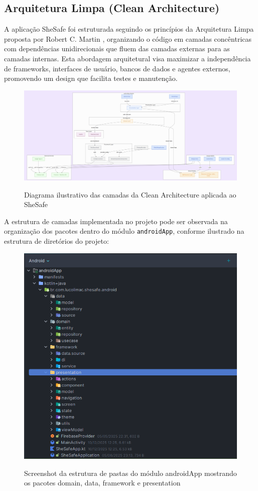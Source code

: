 \subsection{Arquitetura Limpa (Clean Architecture)}
A aplicação SheSafe foi estruturada seguindo os princípios da Arquitetura Limpa proposta por Robert C. Martin \cite{martin2017clean}, organizando o código em camadas concêntricas com dependências unidirecionais que fluem das camadas externas para as camadas internas. Esta abordagem arquitetural visa maximizar a independência de frameworks, interfaces de usuário, bancos de dados e agentes externos, promovendo um design que facilita testes e manutenção.
\begin{figure}[H]
	\centering
	 \includegraphics[width=0.8\linewidth]{images/shesafe/shesafe-architecture.png}\\
	\caption{Diagrama ilustrativo das camadas da Clean Architecture aplicada ao SheSafe}
	\label{fig:clean_architecture}
\end{figure}
A estrutura de camadas implementada no projeto pode ser observada na organização dos pacotes dentro do módulo \texttt{androidApp}, conforme ilustrado na estrutura de diretórios do projeto:
\begin{figure}[H]
	\centering
	 \includegraphics[width=0.8\linewidth]{images/shesafe/screenshot-clean-architecture-shesafe.png}\\
	\caption{Screenshot da estrutura de pastas do módulo androidApp mostrando os pacotes domain, data, framework e presentation}
	\label{fig:estrutura_pastas_androidapp}
\end{figure}
